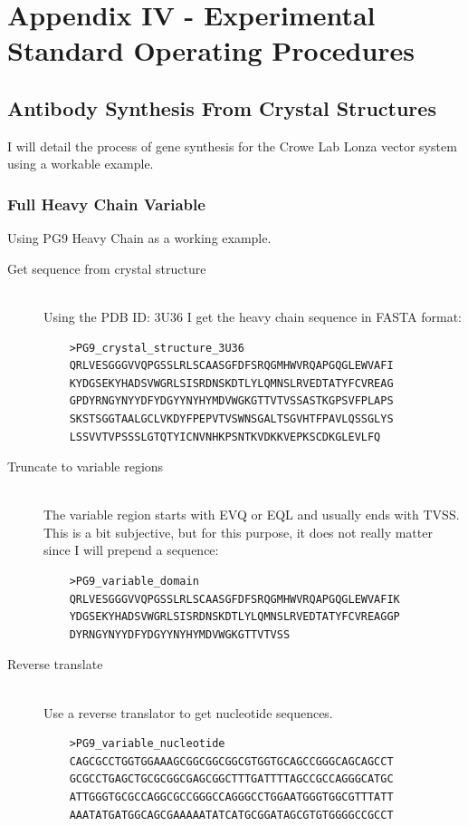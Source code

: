 \section{Appendix IV - Experimental Standard Operating Procedures}
\label{sec:appenixIV}
\subsection{Antibody Synthesis From Crystal Structures}
I will detail the process of gene synthesis for the Crowe Lab Lonza vector system using a workable example.
\singlespacing
\subsubsection{Full Heavy Chain Variable}
Using PG9 Heavy Chain as a working example.
\begin{description}
  \item[Get sequence from crystal structure] \hfill \\
  Using the PDB ID: 3U36 I get the heavy chain sequence in FASTA format:
    \begin{verbatim}
    >PG9_crystal_structure_3U36
    QRLVESGGGVVQPGSSLRLSCAASGFDFSRQGMHWVRQAPGQGLEWVAFI
    KYDGSEKYHADSVWGRLSISRDNSKDTLYLQMNSLRVEDTATYFCVREAG
    GPDYRNGYNYYDFYDGYYNYHYMDVWGKGTTVTVSSASTKGPSVFPLAPS
    SKSTSGGTAALGCLVKDYFPEPVTVSWNSGALTSGVHTFPAVLQSSGLYS
    LSSVVTVPSSSLGTQTYICNVNHKPSNTKVDKKVEPKSCDKGLEVLFQ
    \end{verbatim}
  \item[Truncate to variable regions] \hfill \\
  The variable region starts with EVQ or EQL and usually ends with TVSS. This is a bit subjective, but for this purpose, it does not really matter since I will prepend a sequence:
    \begin{verbatim}
    >PG9_variable_domain
    QRLVESGGGVVQPGSSLRLSCAASGFDFSRQGMHWVRQAPGQGLEWVAFIK
    YDGSEKYHADSVWGRLSISRDNSKDTLYLQMNSLRVEDTATYFCVREAGGP
    DYRNGYNYYDFYDGYYNYHYMDVWGKGTTVTVSS
    \end{verbatim}
  \item[Reverse translate] \hfill \\
  Use a reverse translator to get nucleotide sequences.
    \begin{verbatim}
    >PG9_variable_nucleotide
    CAGCGCCTGGTGGAAAGCGGCGGCGGCGTGGTGCAGCCGGGCAGCAGCCT
    GCGCCTGAGCTGCGCGGCGAGCGGCTTTGATTTTAGCCGCCAGGGCATGC
    ATTGGGTGCGCCAGGCGCCGGGCCAGGGCCTGGAATGGGTGGCGTTTATT
    AAATATGATGGCAGCGAAAAATATCATGCGGATAGCGTGTGGGGCCGCCT

\end{verbatim}
\end{description}
